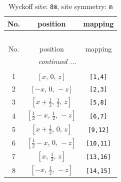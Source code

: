 \documentclass[fleqn,8pt]{jsarticle}
\begin{document}
\begin{longtable}{ccc}
\caption{Wyckoff site: {\tt 8m}, site symmetry: {\tt m}}
 \\
 \hline \hline
No. & position & mapping \\ \hline \endfirsthead

\multicolumn{2}{l}{\tablename\ \thetable{}} \\
 \hline \hline
No. & position & mapping \\ \hline \endhead

 \hline \hline
\multicolumn{2}{r}{\footnotesize\it continued ...} \\ \endfoot

 \hline \hline
\multicolumn{2}{r}{} \\ \endlastfoot

1 & $\left[ x,\, 0,\, z \right]$ & {\tt [1,4]} \\ \hline
2 & $\left[ - x,\, 0,\, - z \right]$ & {\tt [2,3]} \\ \hline
3 & $\left[ x + \frac{1}{2},\, \frac{1}{2},\, z \right]$ & {\tt [5,8]} \\ \hline
4 & $\left[ \frac{1}{2} - x,\, \frac{1}{2},\, - z \right]$ & {\tt [6,7]} \\ \hline
5 & $\left[ x + \frac{1}{2},\, 0,\, z \right]$ & {\tt [9,12]} \\ \hline
6 & $\left[ \frac{1}{2} - x,\, 0,\, - z \right]$ & {\tt [10,11]} \\ \hline
7 & $\left[ x,\, \frac{1}{2},\, z \right]$ & {\tt [13,16]} \\ \hline
8 & $\left[ - x,\, \frac{1}{2},\, - z \right]$ & {\tt [14,15]} \\
\end{longtable}
\renewcommand{\arraystretch}{1.2}
\end{document}
